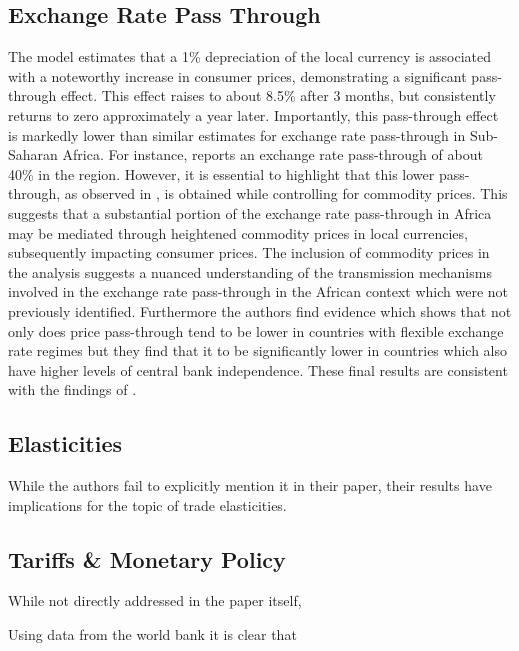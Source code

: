 \documentclass[11pt]{article}
\begin{document}
\begin{spacing}{2}
		\subsection{Exchange Rate Pass Through}
		The model estimates that a 1\% depreciation of the local currency is associated with a noteworthy increase in consumer prices, demonstrating a significant pass-through effect. This effect raises to about 8.5\% after 3 months, but consistently returns to zero approximately a year later. Importantly, this pass-through effect is markedly lower than similar estimates for exchange rate pass-through in Sub-Saharan Africa. For instance, \cite{razafimahefa2012exchange} reports an exchange rate pass-through of about 40\% in the region. However, it is essential to highlight that this lower pass-through, as observed in \cite{lemaire2023international}, is obtained while controlling for commodity prices. This suggests that a substantial portion of the exchange rate pass-through in Africa may be mediated through heightened commodity prices in local currencies, subsequently impacting consumer prices. The inclusion of commodity prices in the analysis suggests a nuanced understanding of the transmission mechanisms involved in the exchange rate pass-through in the African context which were not previously identified.
		Furthermore the authors find evidence which shows that not only does price pass-through tend to be lower in countries with flexible exchange rate regimes but they find that it to be significantly lower in countries which also have higher levels of central bank independence. These final results are consistent with the findings of \cite{ha2020inflation}. 
		
		\subsection{Elasticities}
		While the authors fail to explicitly mention it in their paper, their results have implications for the topic of trade elasticities. 
		
		\subsection{Tariffs \& Monetary Policy}
		While not directly addressed in the paper itself, 
		
		Using data from the world bank it is clear that 
		
		
		\pagebreak
		\printbibliography
		
	\end{spacing}
\end{document}
